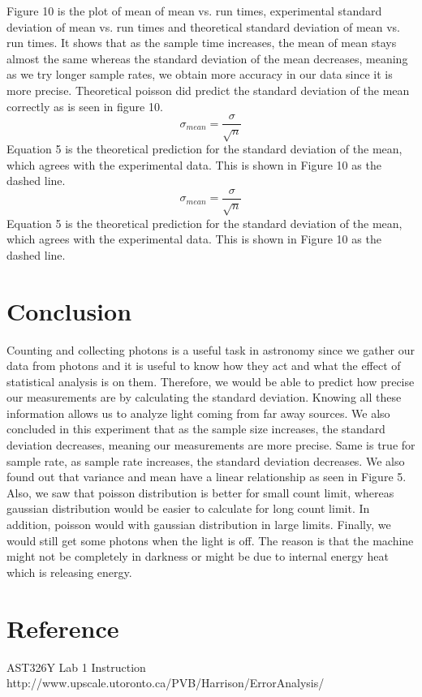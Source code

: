 \documentclass[letterpaper,12pt]{article}
\begin{document}
\newpage
Figure 10 is the plot of mean of mean vs. run times, experimental standard deviation of mean vs. run times and theoretical standard deviation of mean vs. run times. It shows that as the sample time increases, the mean of mean stays almost the same whereas the standard deviation of the mean decreases, meaning as we try longer sample rates, we obtain more accuracy in our data since it is more precise. Theoretical poisson did predict the standard deviation of the mean correctly as is seen in figure 10. 
\begin{equation}
\label{sigma}
\sigma_{mean}= \frac{\sigma}{\sqrt{n}}
\end{equation}
Equation 5 is the theoretical prediction for the standard deviation of the mean, which agrees with the experimental data. This is shown in Figure 10 as the dashed line.
\begin{equation}
\label{sigma}
\sigma_{mean}= \frac{\sigma}{\sqrt{n}}
\end{equation}
Equation 5 is the theoretical prediction for the standard deviation of the mean, which agrees with the experimental data. This is shown in Figure 10 as the dashed line.

\section{Conclusion}
\label{sec:conclusion}
Counting and collecting photons is a useful task in astronomy since we gather our data from photons and it is useful to know how they act and what the effect of statistical analysis is on them. Therefore, we would be able to predict how precise our measurements are by calculating the standard deviation. Knowing all these information allows us to analyze light coming from far away sources.
We also concluded in this experiment that as the sample size increases, the standard deviation decreases, meaning our measurements are more precise. Same is true for sample rate, as sample rate increases, the standard deviation decreases. We also found out that variance and mean have a linear relationship as seen in Figure 5.
Also, we saw that poisson distribution is better for small count limit, whereas gaussian distribution would be easier to calculate for long count limit. In addition, poisson would  with gaussian distribution in large limits. 
Finally, we would still get some photons when the light is off. The reason is that the machine might not be completely in darkness or might be due to internal energy heat which is releasing energy.


\section{Reference}
\label{sec:reference}

AST326Y Lab 1 Instruction
\newline
http://www.upscale.utoronto.ca/PVB/Harrison/ErrorAnalysis/
\end{document}
